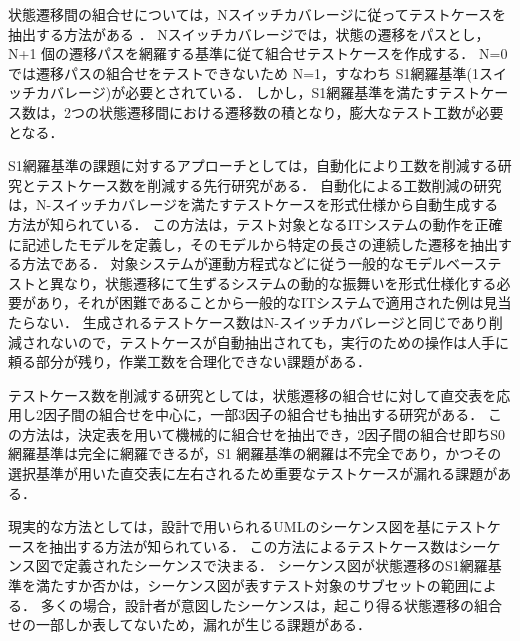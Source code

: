 状態遷移間の組合せについては，Nスイッチカバレージに従ってテストケースを抽出する方法がある \cite{chow1978testing}\cite{whittaker1994markov}\cite{lee1996principles}\cite{fujiwara1991test}\cite{andrews2005testing}．
Nスイッチカバレージでは，状態の遷移をパスとし，N+1 個の遷移パスを網羅する基準に従て組合せテストケースを作成する．
N=0 では遷移パスの組合せをテストできないため N=1，すなわち S1網羅基準(1スイッチカバレージ)が必要とされている．
しかし，S1網羅基準を満たすテストケース数は，2つの状態遷移間における遷移数の積となり，膨大なテスト工数が必要となる．

S1網羅基準の課題に対するアプローチとしては，自動化により工数を削減する研究とテストケース数を削減する先行研究がある．
自動化による工数削減の研究は，N-スイッチカバレージを満たすテストケースを形式仕様から自動生成する方法が知られている．
この方法は，テスト対象となるITシステムの動作を正確に記述したモデルを定義し，そのモデルから特定の長さの連続した遷移を抽出する方法である\cite{takagi2010concurrent}．
対象システムが運動方程式などに従う一般的なモデルベーステストと異なり，状態遷移にて生ずるシステムの動的な振舞いを形式仕様化する必要があり，それが困難であることから一般的なITシステムで適用された例は見当たらない．
生成されるテストケース数はN-スイッチカバレージと同じであり削減されないので，テストケースが自動抽出されても，実行のための操作は人手に頼る部分が残り，作業工数を合理化できない課題がある．

テストケース数を削減する研究としては，状態遷移の組合せに対して直交表を応用し2因子間の組合せを中心に，一部3因子の組合せも抽出する研究がある\cite{akiyama2007}\cite{akiyama2012}．
この方法は，決定表を用いて機械的に組合せを抽出でき，2因子間の組合せ即ちS0網羅基準は完全に網羅できるが，S1 網羅基準の網羅は不完全であり，かつその選択基準が用いた直交表に左右されるため重要なテストケースが漏れる課題がある．

現実的な方法としては，設計で用いられるUMLのシーケンス図を基にテストケースを抽出する方法が知られている\cite{hartmann2000uml}．
この方法によるテストケース数はシーケンス図で定義されたシーケンスで決まる．
シーケンス図が状態遷移のS1網羅基準を満たすか否かは，シーケンス図が表すテスト対象のサブセットの範囲による．
多くの場合，設計者が意図したシーケンスは，起こり得る状態遷移の組合せの一部しか表してないため，漏れが生じる課題がある．

\newpage
